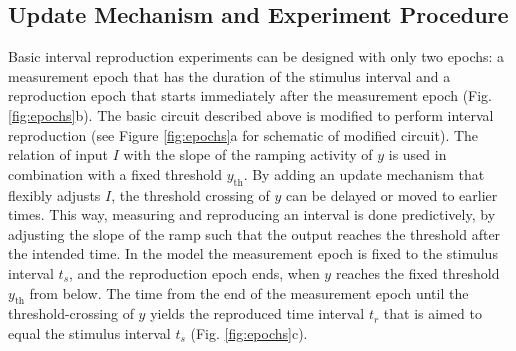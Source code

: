 \documentclass[10pt]{article}
\begin{document}
\subsection{Update Mechanism and Experiment Procedure}
Basic interval reproduction experiments can be designed with only two epochs: a measurement epoch that has the duration of the stimulus interval and a reproduction epoch that starts immediately after the measurement epoch (Fig. \ref{fig:epochs}b). 
The basic circuit described above is modified to perform interval reproduction (see Figure \ref{fig:epochs}a for schematic of modified circuit).
The relation of input $I$ with the slope of the ramping activity of $y$ is used in combination with a fixed threshold $y_{\text{th}}$.
By adding an update mechanism that flexibly adjusts $I$, the threshold crossing of $y$ can be delayed or moved to earlier times.
This way, measuring and reproducing an interval is done predictively, by adjusting the slope of the ramp such that the output reaches the threshold after the intended time.
In the model the measurement epoch is fixed to the stimulus interval $t_s$, and the reproduction epoch ends, when $y$ reaches the fixed threshold $y_{\text{th}}$ from below. 
The time from the end of the measurement epoch until the threshold-crossing of $y$ yields the reproduced time interval $t_r$ that is aimed to equal the stimulus interval $t_s$ (Fig. \ref{fig:epochs}c).
\end{document}

